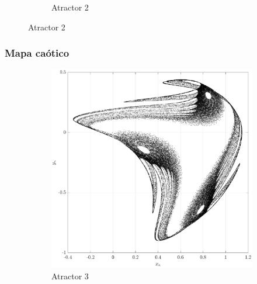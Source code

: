 \documentclass[10pt]{beamer}
\begin{document}
\begin{frame}
\begin{figure}[hbtp]
\begin{subfigure}[b]{0.475\textwidth}
                \caption{Atractor 2}    
                \label{fig:mapa_2}
            \end{subfigure}
        \end{figure}
\end{frame}


\begin{frame}
    \frametitle{Mapa caótico}
	\begin{figure}[hbtp]
            \centering
            \caption{Diferentes atractores caóticos del mapa bidimensional $A_{3}$ y $A_{4}$.} 
            \begin{subfigure}[b]{0.475\textwidth}   
                \centering 
                \includegraphics[width=\textwidth,trim=70 0 70 0,clip]{G3_map3}
                \caption{Atractor 3}    
                \label{fig:mapa_3}
            \end{subfigure}
            \hfill
            \begin{subfigure}[b]{0.475\textwidth}   
                \centering 

\end{subfigure}
\end{figure}
\end{frame}
\end{document}
